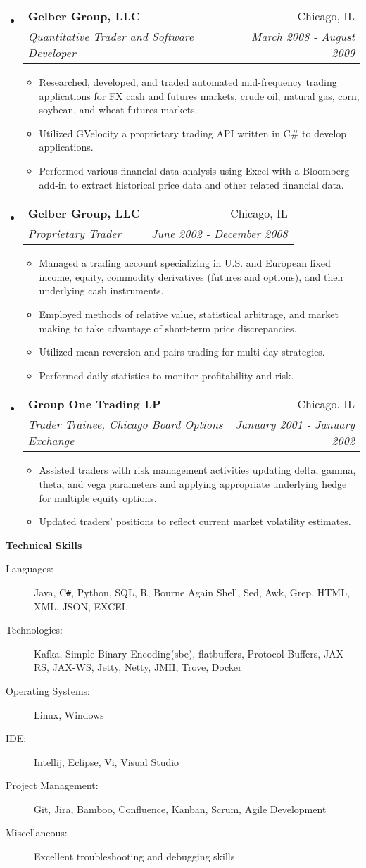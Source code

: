 \documentclass[letterpaper,10pt]{article}
\makeatletter
\newcommand{\resitem}[1]{\item #1 \vspace{-2pt}}
\newcommand{\resheading}[1]{{\large \colorbox{mygrey}{\begin{minipage}{\textwidth}{\textbf{#1 \vphantom{p\^{E}}}}\end{minipage}}}}
\newcommand{\ressubheading}[4]{
\begin{tabular*}{7.0in}{l@{\extracolsep{\fill}}r}
		\textbf{#1} & #2 \\
		\textit{#3} & \textit{#4} \\
\end{tabular*}\vspace{-6pt}}
\makeatother
\begin{document}
\begin{itemize}
\item
	\ressubheading{Gelber Group, LLC}{Chicago, IL}{Quantitative Trader and Software Developer}{March 2008 - August 2009}
	\begin{itemize}
		\resitem{Researched, developed, and traded automated mid-frequency trading applications for FX cash and 
   futures markets, crude oil, natural gas, corn, soybean, and wheat futures markets.}
		\resitem{Utilized GVelocity a proprietary trading API written in C\# to develop applications.}
		\resitem{Performed various financial data analysis using Excel with a Bloomberg add-in to extract historical price data and other related financial data.}
	\end{itemize}

\item
	\ressubheading{Gelber Group, LLC}{Chicago, IL}{Proprietary Trader}{June 2002 - December 2008}
	\begin{itemize}
		\resitem{Managed a trading account specializing in U.S. and European fixed income, equity, commodity
   derivatives (futures and options), and their underlying cash instruments.}
		\resitem{Employed methods of relative value, statistical arbitrage, and market making to take advantage 
   of short-term price discrepancies.}
		\resitem{Utilized mean reversion and pairs trading for multi-day strategies.}
		\resitem{Performed daily statistics to monitor profitability and risk. }
	\end{itemize}

\item
	\ressubheading{Group One Trading LP}{Chicago, IL}{Trader Trainee, Chicago Board Options Exchange}{January 2001 - January 2002}
	\begin{itemize}
		\resitem{Assisted traders with risk management activities updating delta, gamma, theta, and vega
  parameters and applying appropriate underlying hedge for multiple equity options.}
		\resitem{Updated traders’ positions to reflect current market volatility estimates.}
	\end{itemize}

\end{itemize}

\resheading{Technical Skills}

\begin{description}
\item[Languages:]
Java, C{}\verb!#!, Python, SQL, R, Bourne Again Shell, Sed, Awk, Grep, HTML, XML, JSON, EXCEL
\item[Technologies:]
Kafka, Simple Binary Encoding(sbe), flatbuffers, Protocol Buffers, JAX-RS, JAX-WS, Jetty, Netty, JMH, Trove, Docker
\item[Operating Systems:]
Linux, Windows
\item[IDE:]
Intellij, Eclipse, Vi, Visual Studio
\item[Project Management:]
Git, Jira, Bamboo, Confluence, Kanban, Scrum, Agile Development
\item[Miscellaneous:]
Excellent troubleshooting and debugging skills
\end{description}


\end{document}
